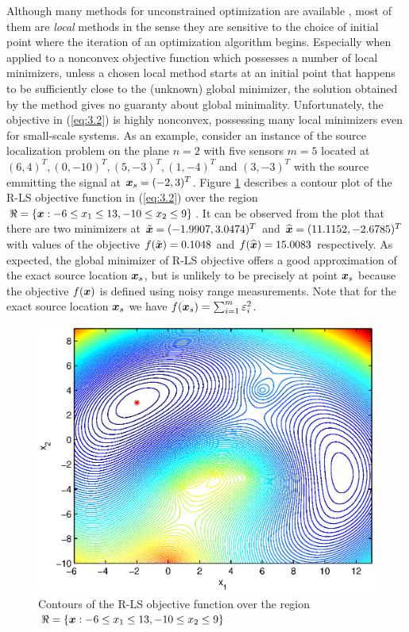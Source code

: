 Although many methods for unconstrained optimization are available \cite{AntonLu}, most of them are \textit{local} methods in the sense they are sensitive to the choice of initial point where the iteration of an optimization algorithm begins. Especially when applied to a nonconvex objective function which possesses a number of local minimizers, unless a chosen local method starts at an initial point that happens to be sufficiently close to the (unknown) global minimizer, the solution obtained by the method gives no guaranty about global minimality. Unfortunately, the objective in (\ref{eq:3.2}) is highly nonconvex, possessing many local minimizers even for small-scale systems. As an example, consider an instance of the source localization problem on the plane $n = 2$ with five sensors $ m = 5$ located at $(6,4)^T, (0,-10)^T, (5,-3)^T, (1,-4)^T$ and  $(3,-3)^T$ with the source emmitting the signal at $\mbox{\boldmath$x$}_s = (-2,3)^T$. Figure \ref{fig:ExampleOfRLSNonconvexity} describes a contour plot of the R-LS objective function in (\ref{eq:3.2}) over the region $\Re = \{\mbox{\boldmath$x$}: -6 \leq x_1 \leq 13, -10 \leq x_2 \leq 9 \}$. It can be observed from the plot that there are two minimizers at $\tilde{\mbox{\boldmath$x$}} = (-1.9907, 3.0474)^T$ and $\widehat{\mbox{\boldmath$x$}} = (11.1152, -2.6785)^T$ with values of the objective  $f(\tilde{\mbox{\boldmath$x$}}) = 0.1048 $ and $f(\widehat{\mbox{\boldmath$x$}}) = 15.0083$ respectively. As expected, the global minimizer of R-LS objective offers a good approximation of the exact source location $\mbox{\boldmath$x$}_s$, but is unlikely to be precisely at point $\mbox{\boldmath$x$}_s$ because the objective $f(\mbox{\boldmath$x$})$ is defined using noisy range measurements. Note that for the exact source location $\mbox{\boldmath$x$}_s$ we have $f(\mbox{\boldmath$x$}_s) = \sum_{i=1}^m \varepsilon_i^2$.

\begin{figure}[t]
\centering
  \includegraphics{figures/nonconvexity_example_ls_new_range}
\caption{Contours of the R-LS objective function over the region $\protect\Re = \protect\lbrace \protect\mbox{\boldmath$x$}:-6\protect\leq x_1 \protect\leq 13, -10\protect\leq x_2 \protect\leq 9 \protect\rbrace$}
\label{fig:ExampleOfRLSNonconvexity}
\end{figure}

